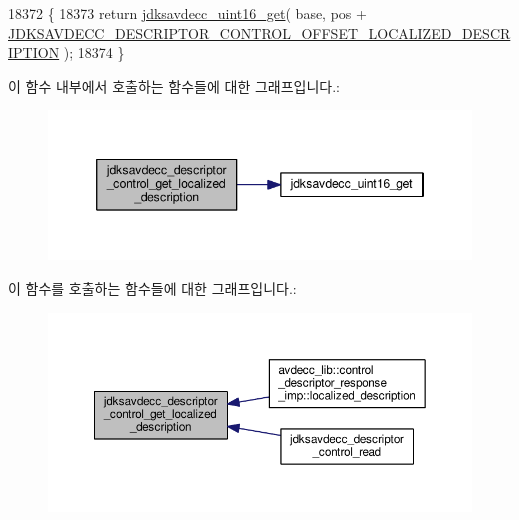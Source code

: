\begin{DoxyCode}
18372 \{
18373     \textcolor{keywordflow}{return} \hyperlink{group__endian_ga3fbbbc20be954aa61e039872965b0dc9}{jdksavdecc\_uint16\_get}( base, pos + 
      \hyperlink{group__descriptor__control_ga89c7e79d9de6538a2bc5fd08eb0d9356}{JDKSAVDECC\_DESCRIPTOR\_CONTROL\_OFFSET\_LOCALIZED\_DESCRIPTION}
       );
18374 \}
\end{DoxyCode}


이 함수 내부에서 호출하는 함수들에 대한 그래프입니다.\+:
\nopagebreak
\begin{figure}[H]
\begin{center}
\leavevmode
\includegraphics[width=346pt]{group__descriptor__control_gac65cfd23f0168aed10f6f0d9b0e5ac71_cgraph}
\end{center}
\end{figure}




이 함수를 호출하는 함수들에 대한 그래프입니다.\+:
\nopagebreak
\begin{figure}[H]
\begin{center}
\leavevmode
\includegraphics[width=350pt]{group__descriptor__control_gac65cfd23f0168aed10f6f0d9b0e5ac71_icgraph}
\end{center}
\end{figure}


